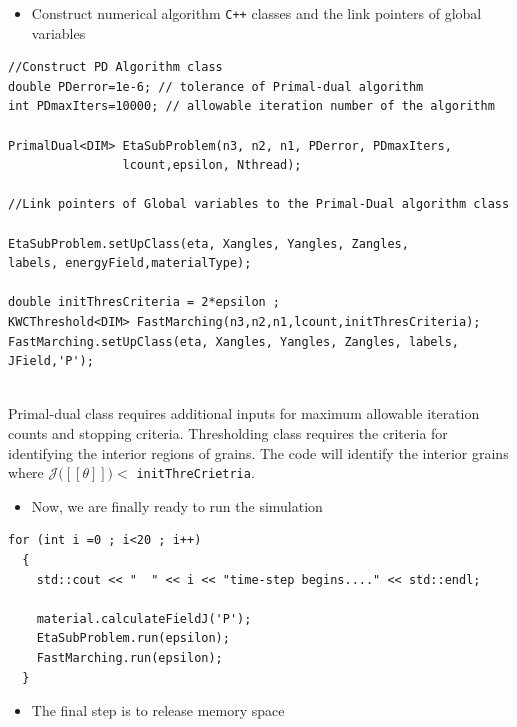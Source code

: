 \documentclass[11pt]{article}
\begin{document}
\begin{itemize} \item Construct numerical algorithm \texttt{C++} classes
and the link pointers of global variables \end{itemize}

\begin{tcolorbox}
\begin{lstlisting}[basicstyle=\footnotesize]
//Construct PD Algorithm class
double PDerror=1e-6; // tolerance of Primal-dual algorithm
int PDmaxIters=10000; // allowable iteration number of the algorithm

PrimalDual<DIM> EtaSubProblem(n3, n2, n1, PDerror, PDmaxIters,
				lcount,epsilon, Nthread);
  
//Link pointers of Global variables to the Primal-Dual algorithm class

EtaSubProblem.setUpClass(eta, Xangles, Yangles, Zangles,
labels, energyField,materialType);

double initThresCriteria = 2*epsilon ;
KWCThreshold<DIM> FastMarching(n3,n2,n1,lcount,initThresCriteria);
FastMarching.setUpClass(eta, Xangles, Yangles, Zangles, labels, JField,'P');
    
\end{lstlisting}
\end{tcolorbox}

Primal-dual class requires additional inputs for maximum allowable 
iteration counts and stopping criteria. 
Thresholding class requires the criteria for identifying the interior regions
of grains. The code will identify the interior grains where 
$\mathcal{J}\big( [\![ \theta]\!]\big) <$ \texttt{initThreCrietria}.

\begin{itemize} \item Now, we are finally ready to run the simulation \end{itemize}

\begin{tcolorbox}
\begin{lstlisting}[basicstyle=\footnotesize]
  for (int i =0 ; i<20 ; i++)
  {
    std::cout << "  " << i << "time-step begins...." << std::endl;
    
    material.calculateFieldJ('P');
    EtaSubProblem.run(epsilon);
    FastMarching.run(epsilon);
  }
\end{lstlisting}
\end{tcolorbox}


\begin{itemize} \item The final step is to release memory space \end{itemize}
\end{document}
